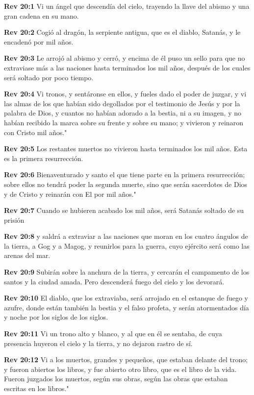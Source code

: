\textbf{Rev 20:1} Vi un ángel que descendía del cielo, trayendo la llave del abismo y una gran cadena en su mano. 

\textbf{Rev 20:2} Cogió al dragón, la serpiente antigua, que es el diablo, Satanás, y le encadenó por mil años. 

\textbf{Rev 20:3} Le arrojó al abismo y cerró, y encima de él puso un sello para que no extraviase más a las naciones hasta terminados los mil años, después de los cuales será soltado por poco tiempo. 

\textbf{Rev 20:4} Vi tronos, y sentáronse en ellos, y fueles dado el poder de juzgar, y vi las almas de los que habían sido degollados por el testimonio de Jesús y por la palabra de Dios, y cuantos no habían adorado a la bestia, ni a su imagen, y no habían recibido la marca sobre su frente y sobre su mano; y vivieron y reinaron con Cristo mil años." 

\textbf{Rev 20:5} Los restantes muertos no vivieron hasta terminados los mil años. Esta es la primera resurrección. 

\textbf{Rev 20:6} Bienaventurado y santo el que tiene parte en la primera resurrección; sobre ellos no tendrá poder la segunda muerte, sino que serán sacerdotes de Dios y de Cristo y reinarán con El por mil años." 

\textbf{Rev 20:7} Cuando se hubieren acabado los mil años, será Satanás soltado de su prisión 

\textbf{Rev 20:8} y saldrá a extraviar a las naciones que moran en los cuatro ángulos de la tierra, a Gog y a Magog, y reunirlos para la guerra, cuyo ejército será como las arenas del mar. 

\textbf{Rev 20:9} Subirán sobre la anchura de la tierra, y cercarán el campamento de los santos y la ciudad amada. Pero descenderá fuego del cielo y los devorará. 

\textbf{Rev 20:10} El diablo, que los extraviaba, será arrojado en el estanque de fuego y azufre, donde están también la bestia y el falso profeta, y serán atormentados día y noche por los siglos de los siglos. 

\textbf{Rev 20:11} Vi un trono alto y blanco, y al que en él se sentaba, de cuya presencia huyeron el cielo y la tierra, y no dejaron rastro de sí. 

\textbf{Rev 20:12} Vi a los muertos, grandes y pequeños, que estaban delante del trono; y fueron abiertos los libros, y fue abierto otro libro, que es el libro de la vida. Fueron juzgados los muertos, según sus obras, según las obras que estaban escritas en los libros." 

